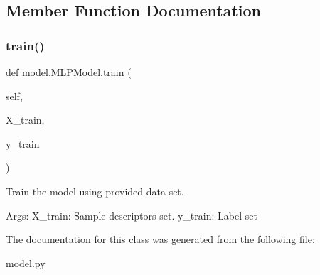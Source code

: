 \subsection{Member Function Documentation}
\mbox{\label{classmodel_1_1_m_l_p_model_a08d6099f82c8e7590f725d8be8d5f7a0}} 
\subsubsection{\texorpdfstring{train()}{train()}}
{\footnotesize\ttfamily def model.\+M\+L\+P\+Model.\+train (\begin{DoxyParamCaption}\item[{}]{self,  }\item[{}]{X\+\_\+train,  }\item[{}]{y\+\_\+train }\end{DoxyParamCaption})}



Train the model using provided data set. 

Args\+: X\+\_\+train\+: Sample descriptors set. y\+\_\+train\+: Label set 

The documentation for this class was generated from the following file\+:\begin{DoxyCompactItemize}
\item 
model.\+py\end{DoxyCompactItemize}
